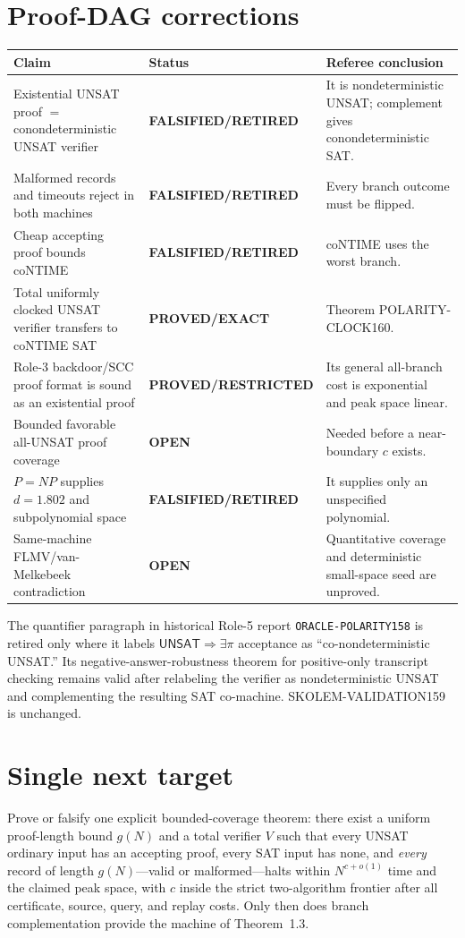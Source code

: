 \documentclass[11pt]{article}
\newcommand{\status}[1]{\textbf{#1}}
\newcommand{\UNSAT}{\mathsf{UNSAT}}
\begin{document}
\section*{Proof-DAG corrections}
\begin{center}
\begin{tabularx}{\textwidth}{@{}p{}p{}X@{}}
\toprule
Claim & Status & Referee conclusion\\
\midrule
Existential UNSAT proof $=$ conondeterministic UNSAT verifier
& \status{FALSIFIED/RETIRED} & It is nondeterministic UNSAT; complement gives
conondeterministic SAT.\\
Malformed records and timeouts reject in both machines
& \status{FALSIFIED/RETIRED} & Every branch outcome must be flipped.\\
Cheap accepting proof bounds coNTIME
& \status{FALSIFIED/RETIRED} & coNTIME uses the worst branch.\\
Total uniformly clocked UNSAT verifier transfers to coNTIME SAT
& \status{PROVED/EXACT} & Theorem POLARITY-CLOCK160.\\
Role-3 backdoor/SCC proof format is sound as an existential proof
& \status{PROVED/RESTRICTED} & Its general all-branch cost is exponential and
peak space linear.\\
Bounded favorable all-UNSAT proof coverage
& \status{OPEN} & Needed before a near-boundary $c$ exists.\\
$P=NP$ supplies $d=1.802$ and subpolynomial space
& \status{FALSIFIED/RETIRED} & It supplies only an unspecified polynomial.\\
Same-machine FLMV/van-Melkebeek contradiction
& \status{OPEN} & Quantitative coverage and deterministic small-space seed are
unproved.\\
\bottomrule
\end{tabularx}
\end{center}

The quantifier paragraph in historical Role-5 report
\texttt{ORACLE-POLARITY158} is retired only where it labels
$\UNSAT\Rightarrow\exists\pi$ acceptance as ``co-nondeterministic UNSAT.''
Its negative-answer-robustness theorem for positive-only transcript checking
remains valid after relabeling the verifier as nondeterministic UNSAT and
complementing the resulting SAT co-machine.  SKOLEM-VALIDATION159 is unchanged.

\section*{Single next target}
Prove or falsify one explicit bounded-coverage theorem:
there exist a uniform proof-length bound $g(N)$ and a total verifier $V$ such
that every UNSAT ordinary input has an accepting proof, every SAT input has
none, and \emph{every} record of length $g(N)$---valid or malformed---halts
within $N^{c+o(1)}$ time and the claimed peak space, with $c$ inside the strict
two-algorithm frontier after all certificate, source, query, and replay costs.
Only then does branch complementation provide the machine of Theorem~1.3.
\end{document}
